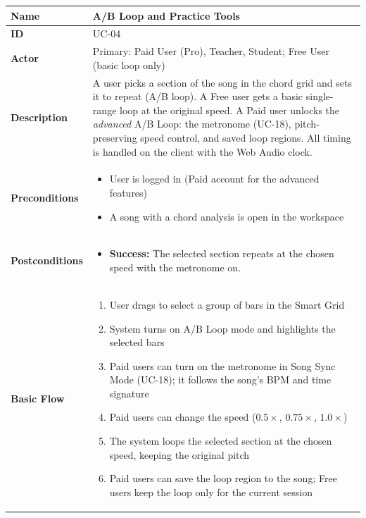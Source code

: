 \documentclass[a4paper]{article}
\newlength{\ucLeft}
\begin{document}
\begin{longtable}{|>{\bfseries}p{\ucLeft}|p{\dimexpr\linewidth-\ucLeft-2\tabcolsep-2\arrayrulewidth}|}
\hline
Name & A/B Loop and Practice Tools \\ \hline
ID & UC-04 \\ \hline
Actor & Primary: Paid User (Pro), Teacher, Student; Free User (basic loop only) \\ \hline
Description & A user picks a section of the song in the chord grid and sets it to repeat (A/B loop). A Free user gets a basic single-range loop at the original speed. A Paid user unlocks the \emph{advanced} A/B Loop: the metronome (UC-18), pitch-preserving speed control, and saved loop regions. All timing is handled on the client with the Web Audio clock. \\ \hline
Preconditions &
\begin{itemize}[leftmargin=1em, nosep, topsep=2pt, partopsep=0pt, parsep=0pt, after=\strut]
    \item User is logged in (Paid account for the advanced features)
    \item A song with a chord analysis is open in the workspace
\end{itemize}
\\ \hline
Postconditions &
\begin{itemize}[leftmargin=1em, nosep, topsep=2pt, partopsep=0pt, parsep=0pt, after=\strut]
    \item \textbf{Success:} The selected section repeats at the chosen speed with the metronome on.
\end{itemize}
\\ \hline
Basic Flow &
\begin{enumerate}[leftmargin=1.5em, nosep, topsep=2pt, partopsep=0pt, parsep=0pt, after=\strut]
    \item User drags to select a group of bars in the Smart Grid
    \item System turns on A/B Loop mode and highlights the selected bars
    \item Paid users can turn on the metronome in Song Sync Mode (UC-18); it follows the song's BPM and time signature
    \item Paid users can change the speed ($0.5\times$, $0.75\times$, $1.0\times$)
    \item The system loops the selected section at the chosen speed, keeping the original pitch
    \item Paid users can save the loop region to the song; Free users keep the loop only for the current session

\end{enumerate}
\end{longtable}
\end{document}

